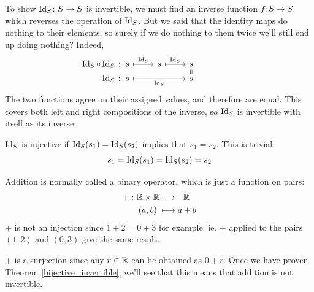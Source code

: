 \begin{example}
    To show $\operatorname{Id}_S \colon S \to S$ is invertible, we must find an inverse function $f \colon S \to S$ which reverses the operation of $\operatorname{Id}_S$. But we said that the identity maps do nothing to their elements, so surely if we do nothing to them twice we'll still end up doing nothing? Indeed,
    \begin{equation*}
        \begin{tikzcd}[row sep=0.1em]
            \mathllap{\Id_S \circ \Id_S \;\colon\:} s \arrow[r, maps to, "{\Id_S}"]
                & s \arrow[r, maps to, "{\Id_S}"]
                & s \arrow[d, equal] \\
            \mathllap{\phantom{\Id_S \circ{}}\Id_S \;\colon\:} s \arrow[rr, maps to, "{\Id_S}"']
                & {}
                & s
        \end{tikzcd}
    \end{equation*}
    The two functions agree on their assigned values, and therefore are equal. This covers both left and right compositions of the inverse, so $\operatorname{Id}_S$ is invertible with itself as its inverse.

    \medskip\noindent
    $\operatorname{Id}_S$ is injective if $\operatorname{Id}_S(s_1) = \operatorname{Id}_S(s_2)$ implies that $s_1 = s_2$. This is trivial:
    \begin{equation*}
        s_1 = \operatorname{Id}_S(s_1) = \operatorname{Id}_S(s_2) = s_2
    \end{equation*}
\end{example}
\begin{example}[Addition]
    Addition is normally called a binary operator, which is just a function on pairs:
    \begin{align*}
        +\, \colon \mathbb{R} \times \mathbb{R} &\longrightarrow\:\:\: \mathbb{R} \\
                        (a,b)\; &\longmapsto     a + b
    \end{align*}
    $+$ is not an injection since $1 + 2 = 0 + 3$ for example. ie. $+$ applied to the pairs $(1,2)$ and $(0,3)$ give the same result.

    \medskip\noindent
    $+$ is a surjection since any $r \in \mathbb{R}$ can be obtained as $0 + r$.
    Once we have proven Theorem \ref{bijective_invertible}, we'll see that this means that addition is not invertible.
\end{example}
